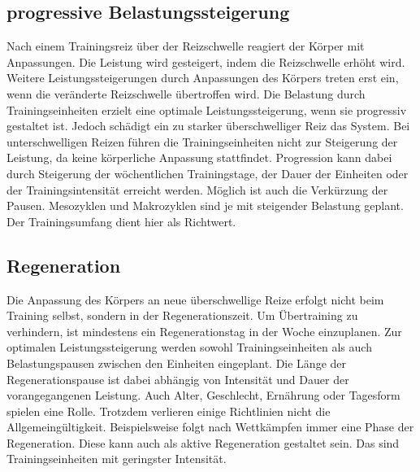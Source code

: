 \subsection{progressive Belastungssteigerung}
Nach einem Trainingsreiz über der Reizschwelle reagiert der Körper mit Anpassungen. Die Leistung wird gesteigert, indem die Reizschwelle erhöht wird. Weitere Leistungssteigerungen durch Anpassungen des Körpers treten erst ein, wenn die veränderte Reizschwelle übertroffen wird. Die Belastung durch Trainingseinheiten erzielt eine optimale Leistungssteigerung, wenn sie progressiv gestaltet ist. Jedoch schädigt ein zu starker überschwelliger Reiz das System. Bei unterschwelligen Reizen führen die Trainingseinheiten nicht zur Steigerung der Leistung, da keine körperliche Anpassung stattfindet. \cite[58]{Seidenspinner2005} Progression kann dabei durch Steigerung der wöchentlichen Trainingstage, der Dauer der Einheiten oder der Trainingsintensität erreicht werden. Möglich ist auch die Verkürzung der Pausen.\newline 
Mesozyklen und Makrozyklen sind je mit steigender Belastung geplant. Der Trainingsumfang dient hier als Richtwert.\cite[60-61]{Radsporttraining}
\subsection{Regeneration}
Die Anpassung des Körpers an neue überschwellige Reize erfolgt nicht beim Training selbst, sondern in der Regenerationszeit. Um Übertraining zu verhindern, ist mindestens ein Regenerationstag in der Woche einzuplanen. 
Zur optimalen Leistungssteigerung werden sowohl Trainingseinheiten als auch Belastungspausen zwischen den Einheiten eingeplant. Die Länge der Regenerationspause ist dabei abhängig von Intensität und Dauer der vorangegangenen Leistung. Auch Alter, Geschlecht, Ernährung oder Tagesform spielen eine Rolle. Trotzdem verlieren einige Richtlinien nicht die Allgemeingültigkeit. Beispielsweise folgt nach Wettkämpfen immer eine Phase der Regeneration. Diese kann auch als aktive Regeneration gestaltet sein. Das sind Trainingseinheiten mit geringster Intensität.
